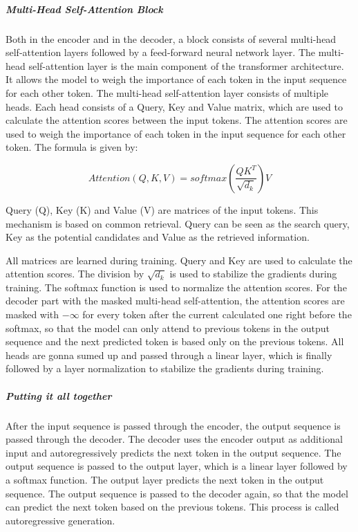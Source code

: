 \subparagraph{Multi-Head Self-Attention Block}

Both in the encoder and in the decoder, a block consists of several multi-head self-attention layers followed by a feed-forward neural network layer. The multi-head self-attention layer is the main component of the transformer architecture. It allows the model to weigh the importance of each token in the input sequence for each other token. The multi-head self-attention layer consists of multiple heads. Each head consists of a Query, Key and Value matrix, which are used to calculate the attention scores between the input tokens. The attention scores are used to weigh the importance of each token in the input sequence for each other token. The formula is given by:

$$Attention(Q,K, V) = softmax(\frac{QK^T}{\sqrt{d_k}})V$$

Query (Q), Key (K) and Value (V) are matrices of the input tokens. This mechanism is based on common retrieval. Query can be seen as the search query, Key as the potential candidates and Value as the retrieved information.

All matrices are learned during training. Query and Key are used to calculate the attention scores. The division by $\sqrt{d_k}$ is used to stabilize the gradients during training. The softmax function is used to normalize the attention scores. For the decoder part with the masked multi-head self-attention, the attention scores are masked with $-\infty$ for every token after the current calculated one right before the softmax, so that the model can only attend to previous tokens in the output sequence and the next predicted token is based only on the previous tokens. All heads are gonna sumed up and passed through a linear layer, which is finally followed by a layer normalization to stabilize the gradients during training. 

\subparagraph{Putting it all together}
After the input sequence is passed through the encoder, the output sequence is passed through the decoder. The decoder uses the encoder output as additional input and autoregressively predicts the next token in the output sequence. The output sequence is passed to the output layer, which is a linear layer followed by a softmax function. The output layer predicts the next token in the output sequence. The output sequence is passed to the decoder again, so that the model can predict the next token based on the previous tokens. This process is called autoregressive generation.

